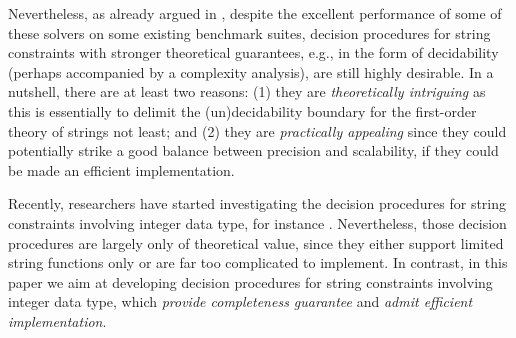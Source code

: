 Nevertheless, as already argued in \cite{CHL+19}, despite the excellent performance of some of these solvers on some existing benchmark suites, decision procedures for string constraints with stronger theoretical guarantees, e.g., in the form of decidability (perhaps accompanied by a complexity analysis), are still highly desirable. In a nutshell, there are at least two reasons: (1) they are \emph{theoretically intriguing} as this is essentially to delimit the (un)decidability boundary for the first-order theory of strings not least; %
and  %
(2) they are \emph{practically appealing} since they could potentially strike a good balance between precision and scalability, if they could be made an efficient implementation. %


Recently, researchers have started investigating the decision procedures for string constraints involving integer data type, for instance \cite{Vijay-length,LeH18,LinM18,LB16}. Nevertheless, those decision procedures are largely only of theoretical value, since they either support limited string functions only or are far too complicated to  implement. 
In contrast, in this paper we aim at developing decision procedures for string constraints involving integer data type, which %
\emph{provide completeness guarantee} and %
\emph{admit efficient implementation}.

